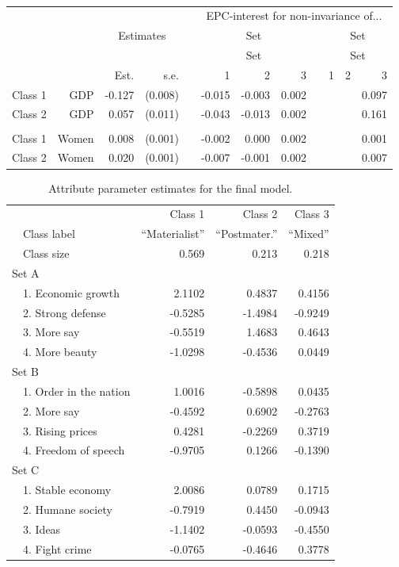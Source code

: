 \documentclass[letterpaper,12pt]{article}
\begin{document}
\begin{table}
	\begin{tabular}{lrrrrrrrrrrr}
	\hline
		&&&&&\multicolumn{7}{c}{EPC-interest for non-invariance of...}\\
		&&\multicolumn{2}{c}{Estimates}&&\multicolumn{3}{c}{Set} && \multicolumn{3}{c}{Set}\\
			\hline
		&&&&&\multicolumn{3}{c}{Set} && \multicolumn{3}{c}{Set}\\
\cline{3-4}\cline{6-8}\cline{10-12}
			&	&	Est.&	s.e.&	&	1  &	2  &	3  &&	  1&	2 &	3\\
				\hline
Class 1&	GDP&	-0.127&	(0.008)&	&	-0.015&	-0.003&	0.002&&	&	&	0.097\\
Class 2&	GDP&	0.057&	(0.011)&	&	-0.043&	-0.013&	0.002&&	&	&	0.161\\
\\
Class 	1&	Women&	0.008&	(0.001)&	&	-0.002&	0.000&	0.002&	&&	&	0.001\\
Class 	2&	Women&	0.020&	(0.001)&	&	-0.007&	-0.001&	0.002&	&&	&	0.007\\
\hline
	\end{tabular}
	\caption{\label{tab:epc-interest-model2}}

\end{table}



\begin{table}\centering
	\begin{tabular}{llrrr}
	\hline
			&&	Class 1	&	Class 2	&	Class 3\\
			&Class label& ``Materialist'' & ``Postmater.'' & ``Mixed''\\
& Class size & 0.569 & 0.213 & 0.218\\
				\hline
\multicolumn{3}{l}{Set A}\\
& 1. Economic growth	&	2.1102	&	0.4837	&	0.4156\\
& 2. Strong defense	&	-0.5285	&	-1.4984	&	-0.9249\\
& 3. More say	&	-0.5519	&	1.4683	&	0.4643\\
& 4. More beauty	&	-1.0298	&	-0.4536	&	0.0449\\
\multicolumn{3}{l}{Set B}\\
& 1. Order in the nation	&	1.0016	&	-0.5898	&	0.0435\\
& 2. More say	&	-0.4592	&	0.6902	&	-0.2763\\
& 3. Rising prices	&	0.4281	&	-0.2269	&	0.3719\\
& 4. Freedom of speech	&	-0.9705	&	0.1266	&	-0.1390\\
\multicolumn{3}{l}{Set C}\\
& 1. Stable economy	&	2.0086	&	0.0789	&	0.1715\\
& 2. Humane society	&	-0.7919	&	0.4450	&	-0.0943\\
& 3. Ideas	&	-1.1402	&	-0.0593	&	-0.4550\\
& 4. Fight crime	&	-0.0765	&	-0.4646	&	0.3778\\
	\hline
	\end{tabular}
	\caption{\label{tab:attribute-parameters}Attribute parameter estimates for the 
		final model.}

\end{table}
\end{document}

